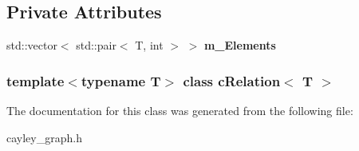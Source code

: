 \subsection*{\-Private \-Attributes}
\begin{DoxyCompactItemize}
\item 
\hypertarget{classcRelation_ae17c35b31ca6d3da00eb6d0da8207711}{
std\-::vector$<$ std\-::pair$<$ \-T, int $>$ $>$ {\bfseries m\-\_\-\-Elements}}
\label{classcRelation_ae17c35b31ca6d3da00eb6d0da8207711}

\end{DoxyCompactItemize}
\subsubsection*{template$<$typename T$>$ class c\-Relation$<$ T $>$}



\-The documentation for this class was generated from the following file\-:\begin{DoxyCompactItemize}
\item 
cayley\-\_\-graph.\-h\end{DoxyCompactItemize}
